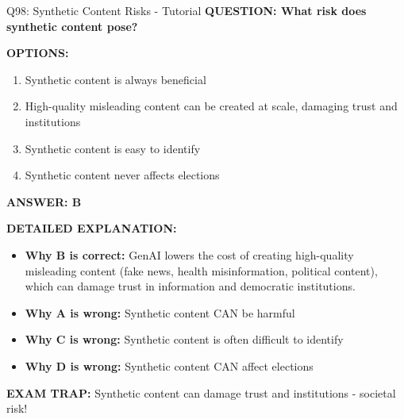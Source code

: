 \documentclass[8pt]{beamer}
\begin{document}
	\begin{frame}{Q98: Synthetic Content Risks - Tutorial}
		\fontsize{6.5}{7.5}\selectfont
		\textbf{QUESTION: What risk does synthetic content pose?}
		
		\vspace{0.1cm}
		\textbf{OPTIONS:}
		\begin{enumerate}
			\item Synthetic content is always beneficial
			\item High-quality misleading content can be created at scale, damaging trust and institutions
			\item Synthetic content is easy to identify
			\item Synthetic content never affects elections
		\end{enumerate}
		
		\vspace{0.1cm}
		\textcolor{myblue}{\textbf{ANSWER: B}}
		
		\vspace{0.1cm}
		\textbf{DETAILED EXPLANATION:}
		\begin{itemize}
			\item \textbf{Why B is correct:} GenAI lowers the cost of creating high-quality misleading content (fake news, health misinformation, political content), which can damage trust in information and democratic institutions.
			\item \textbf{Why A is wrong:} Synthetic content CAN be harmful
			\item \textbf{Why C is wrong:} Synthetic content is often difficult to identify
			\item \textbf{Why D is wrong:} Synthetic content CAN affect elections
		\end{itemize}
		
		\textcolor{myred}{\textbf{EXAM TRAP:}} Synthetic content can \textcolor{myblue}{damage trust and institutions} - societal risk!
	\end{frame}
	
\end{document}
